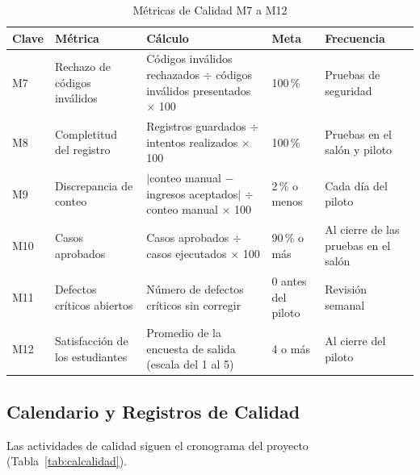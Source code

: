 \begin{table}[tbp]
	\caption{Métricas de Calidad M7 a M12}
	\label{tab:met2}
	\small\setlength{\tabcolsep}{3pt}
	\begin{tabular}{P{0.9cm}P{2.8cm}P{4.4cm}P{3.4cm}P{3.3cm}}
		\toprule
		Clave & Métrica & Cálculo & Meta & Frecuencia \\
		\midrule
		M7 & Rechazo de códigos inválidos & Códigos inválidos rechazados $\div$ códigos inválidos presentados $\times$ 100 & 100\,\% & Pruebas de seguridad \\
		M8 & Completitud del registro & Registros guardados $\div$ intentos realizados $\times$ 100 & 100\,\% & Pruebas en el salón y piloto \\
		M9 & Discrepancia de conteo & $|$conteo manual $-$ ingresos aceptados$|$ $\div$ conteo manual $\times$ 100 & 2\,\% o menos & Cada día del piloto \\
		M10 & Casos aprobados & Casos aprobados $\div$ casos ejecutados $\times$ 100 & 90\,\% o más & Al cierre de las pruebas en el salón \\
		M11 & Defectos críticos abiertos & Número de defectos críticos sin corregir & 0 antes del piloto & Revisión semanal \\
		M12 & Satisfacción de los estudiantes & Promedio de la encuesta de salida (escala del 1 al 5) & 4 o más & Al cierre del piloto \\
		\bottomrule
	\end{tabular}
\end{table}

\subsection{Calendario y Registros de Calidad}
Las actividades de calidad siguen el cronograma del proyecto
(Tabla~\ref{tab:calcalidad}).

